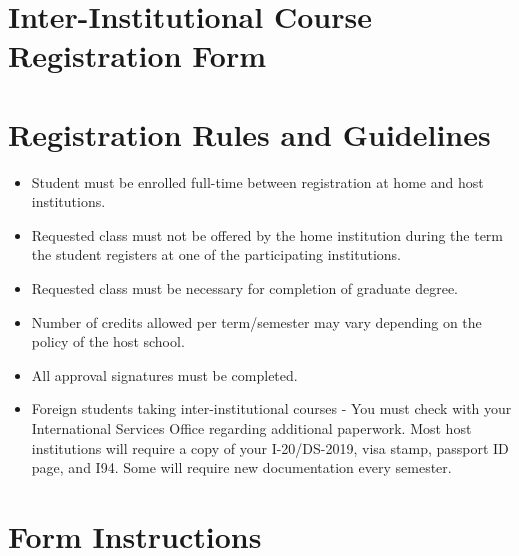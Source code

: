 \documentclass[10pt]{article}
\begin{document}
\selectfont
\section*{\centering Inter-Institutional Course Registration Form}
\section*{Registration Rules and Guidelines}
\begin{itemize}
\setlength{\itemsep}{0.05em}
  \item Student must be enrolled full-time between registration at home and host institutions.
  \item Requested class must not be offered by the home institution during the term the student registers at one of the participating institutions.
  \item Requested class must be necessary for completion of graduate degree.
  \item Number of credits allowed per term/semester may vary depending on the policy of the host school.
  \item All approval signatures must be completed.
  \item Foreign students taking inter-institutional courses - You must check with your International Services Office regarding additional paperwork. Most host institutions will require a copy of your I-20/DS-2019, visa stamp, passport ID page, and I94. Some will require new documentation every semester.
\end{itemize}

\section*{Form Instructions}
\end{document}
